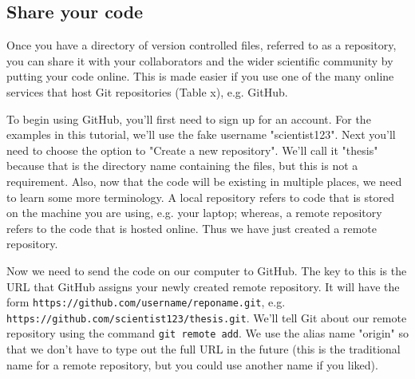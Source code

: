 \subsection{Share your code}

Once you have a directory of version controlled files, referred to as a repository, you can share it with your collaborators and the wider scientific community by putting your code online.
This is made easier if you use one of the many online services that host Git repositories (Table x), e.g. GitHub.

To begin using GitHub, you'll first need to sign up for an account.
For the examples in this tutorial, we'll use the fake username "scientist123".
Next you'll need to choose the option to "Create a new repository".
We'll call it "thesis" because that is the directory name containing the files, but this is not a requirement.
Also, now that the code will be existing in multiple places, we need to learn some more terminology.
A local repository refers to code that is stored on the machine you are using, e.g. your laptop; whereas, a remote repository refers to the code that is hosted online.
Thus we have just created a remote repository.

Now we need to send the code on our computer to GitHub.
The key to this is the URL that GitHub assigns your newly created remote repository.
It will have the form \verb|https://github.com/username/reponame.git|, e.g. \verb|https://github.com/scientist123/thesis.git|.
We'll tell Git about our remote repository using the command \verb|git remote add|.
We use the alias name "origin" so that we don't have to type out the full URL in the future (this is the traditional name for a remote repository, but you could use another name if you liked).


